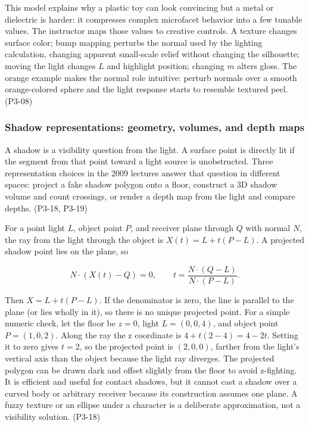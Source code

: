 This model explains why a plastic toy can look convincing but a metal or dielectric is harder: it compresses complex microfacet behavior into a few tunable values. The instructor maps those values to creative controls. A texture changes surface color; bump mapping perturbs the normal used by the lighting calculation, changing apparent small-scale relief without changing the silhouette; moving the light changes \(L\) and highlight position; changing \(m\) alters gloss. The orange example makes the normal role intuitive: perturb normals over a smooth orange-colored sphere and the light response starts to resemble textured peel. (P3-08)

\subsubsection{Shadow representations: geometry, volumes, and depth maps}\label{03-visual-computing-i-ch011-shadow-representations-geometry-volumes-and-depth-maps}

A shadow is a visibility question from the light. A surface point is directly lit if the segment from that point toward a light source is unobstructed. Three representation choices in the 2009 lectures answer that question in different spaces: project a fake shadow polygon onto a floor, construct a 3D shadow volume and count crossings, or render a depth map from the light and compare depths. (P3-18, P3-19)

For a point light \(L\), object point \(P\), and receiver plane through \(Q\) with normal \(N\), the ray from the light through the object is \(X(t)=L+t(P-L)\). A projected shadow point lies on the plane, so

\[
N\cdot(X(t)-Q)=0,\qquad t=\frac{N\cdot(Q-L)}{N\cdot(P-L)}.
\]

Then \(X=L+t(P-L)\). If the denominator is zero, the line is parallel to the plane (or lies wholly in it), so there is no unique projected point. For a simple numeric check, let the floor be \(z=0\), light \(L=(0,0,4)\), and object point \(P=(1,0,2)\). Along the ray the z coordinate is \(4+t(2-4)=4-2t\). Setting it to zero gives \(t=2\), so the projected point is \((2,0,0)\), farther from the light's vertical axis than the object because the light ray diverges. The projected polygon can be drawn dark and offset slightly from the floor to avoid z-fighting. It is efficient and useful for contact shadows, but it cannot cast a shadow over a curved body or arbitrary receiver because its construction assumes one plane. A fuzzy texture or an ellipse under a character is a deliberate approximation, not a visibility solution. (P3-18)


